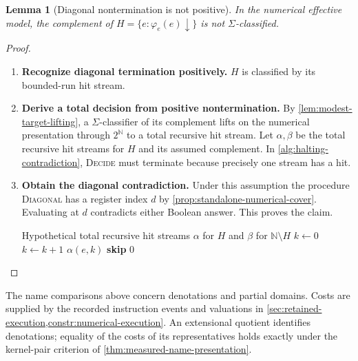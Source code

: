 \documentclass[11pt,a4paper]{article}
\numberwithin{algorithm}{section}
\numberwithin{equation}{section}
\newtheorem{lemma}[lemma]{Lemma}
\theoremstyle{definition}
\theoremstyle{remark}
\theoremstyle{plain}
\newcommand{\N}{\mathbb N}
\theoremstyle{definition}
\theoremstyle{plain}
\begin{document}
\begin{lemma}[Diagonal nontermination is not positive]
\label{lem:standalone-halting}
In the numerical effective model, the complement of
$H=\{e:\varphi_e(e)\downarrow\}$ is not $\Sigma$-classified.
\end{lemma}
\begin{proof}\leavevmode
\begin{enumerate}[leftmargin=*,align=left]
\item \textbf{Recognize diagonal termination positively.}
$H$ is classified by its bounded-run hit stream.

\item \textbf{Derive a total decision from positive nontermination.}
By \cref{lem:modest-target-lifting}, a $\Sigma$-classifier of its
complement lifts on the numerical presentation through $2^\N$
to a total recursive hit stream.
Let $\alpha,\beta$ be the total recursive hit streams for $H$
and its assumed complement. In \cref{alg:halting-contradiction},
\textsc{Decide} must terminate because precisely one stream has a hit.

\item \textbf{Obtain the diagonal contradiction.}
Under this assumption the procedure \textsc{Diagonal} has a register
index $d$ by \cref{prop:standalone-numerical-cover}. Evaluating at $d$
contradicts either Boolean answer. This proves the claim.
\begin{algorithm}[H]
\caption{The diagonal program under the assumed complement classifier}\label{alg:halting-contradiction}
\small
\begin{algorithmic}[1]
\Require Hypothetical total recursive hit streams $\alpha$ for $H$ and $\beta$ for $\N\setminus H$
  \State $k\gets0$
    \State $k\gets k+1$
  \EndWhile
  \State \Return $\alpha(e,k)$
\EndProcedure
{}
      \State \textbf{skip}
    \EndWhile
  \EndIf
  \State \Return $0$
\EndProcedure
\end{algorithmic}
\end{algorithm}
\end{enumerate}
\end{proof}

The name comparisons above concern
denotations and partial domains. Costs are supplied by
the recorded instruction events and valuations in
\cref{sec:retained-execution,constr:numerical-execution}.
An extensional quotient identifies denotations; equality of the costs
of its representatives holds exactly under the kernel-pair criterion
of \cref{thm:measured-name-presentation}.
\end{document}

